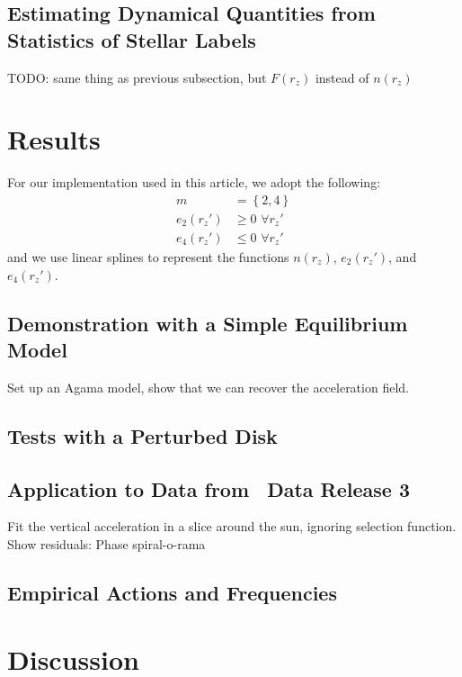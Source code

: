 \subsection{Estimating Dynamical Quantities from Statistics of Stellar Labels}

TODO: same thing as previous subsection, but $F(r_z)$ instead of $n(r_z)$


\section{Results} \label{sec:results}

For our implementation used in this article, we adopt the following:
\begin{align}
    m &= \left\{2, 4\right\} \\
    e_2(r_z') &\geq 0 \,\,\forall r_z'\\
    e_4(r_z') &\leq 0 \,\,\forall r_z'
\end{align}
and we use linear splines to represent the functions $n(r_z)$, $e_2(r_z')$, and
$e_4(r_z')$.


\subsection{Demonstration with a Simple Equilibrium Model}
\label{sec:eq-model}

Set up an Agama model, show that we can recover the acceleration field.


\subsection{Tests with a Perturbed Disk}
\label{sec:diseq-disk}

\subsection{Application to Data from \gaia\ Data Release 3}

Fit the vertical acceleration in a slice around the sun, ignoring selection function.
Show residuals: Phase spiral-o-rama

\subsection{Empirical Actions and Frequencies}
\label{sec:gaiadr3}


\section{Discussion} \label{sec:discussion}

